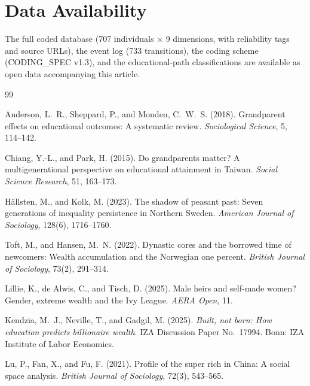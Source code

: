 \documentclass[11pt,a4paper]{article}
\begin{document}
\section*{Data Availability}
The full coded database (707 individuals $\times$ 9 dimensions, with reliability tags and source URLs), the event log (733 transitions), the coding scheme (CODING\_SPEC v1.3), and the educational-path classifications are available as open data accompanying this article.

\begin{thebibliography}{99}
\setlength{\itemsep}{2pt}


Anderson, L.~R., Sheppard, P., and Monden, C.~W.~S. (2018). Grandparent effects on educational outcomes: A systematic review. \emph{Sociological Science}, 5, 114--142.

Chiang, Y.-L., and Park, H. (2015). Do grandparents matter? A multigenerational perspective on educational attainment in Taiwan. \emph{Social Science Research}, 51, 163--173.

H\"allsten, M., and Kolk, M. (2023). The shadow of peasant past: Seven generations of inequality persistence in Northern Sweden. \emph{American Journal of Sociology}, 128(6), 1716--1760.

Toft, M., and Hansen, M.~N. (2022). Dynastic cores and the borrowed time of newcomers: Wealth accumulation and the Norwegian one percent. \emph{British Journal of Sociology}, 73(2), 291--314.

Lillie, K., de Alwis, C., and Tisch, D. (2025). Male heirs and self-made women? Gender, extreme wealth and the Ivy League. \emph{AERA Open}, 11.

Kendzia, M.~J., Neville, T., and Gadgil, M. (2025). \emph{Built, not born: How education predicts billionaire wealth}. IZA Discussion Paper No.~17994. Bonn: IZA Institute of Labor Economics.

Lu, P., Fan, X., and Fu, F. (2021). Profile of the super rich in China: A social space analysis. \emph{British Journal of Sociology}, 72(3), 543--565.


\end{thebibliography}
\end{document}
